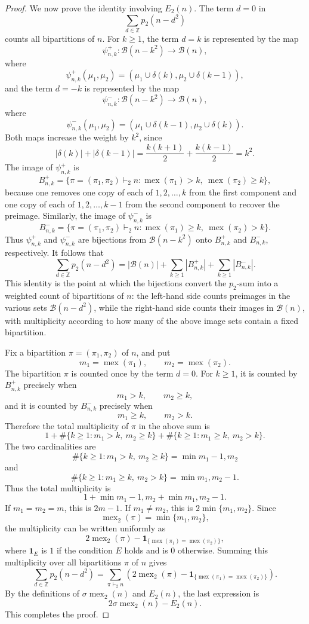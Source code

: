 \documentclass[10pt,a4paper]{amsart}
\newcommand{\mex}{\operatorname{mex}}
\begin{document}
\begin{proof}
We now prove the identity involving $E_2(n)$.  The term $d=0$ in
\[
\sum_{d\in\mathbb Z}p_2(n-d^2)
\]
counts all bipartitions of $n$.  For $k\geq 1$, the term $d=k$ is represented by the map
\[
\psi^+_{n,k}:\mathcal B(n-k^2)\longrightarrow \mathcal B(n),
\]
where
\[
\psi^+_{n,k}(\mu_1,\mu_2)
=
(\mu_1\cup\delta(k),\mu_2\cup\delta(k-1)),
\]
and the term $d=-k$ is represented by the map
\[
\psi^-_{n,k}:\mathcal B(n-k^2)\longrightarrow \mathcal B(n),
\]
where
\[
\psi^-_{n,k}(\mu_1,\mu_2)
=
(\mu_1\cup\delta(k-1),\mu_2\cup\delta(k)).
\]
Both maps increase the weight by $k^2$, since
\[
|\delta(k)|+|\delta(k-1)|
=
\frac{k(k+1)}2+\frac{k(k-1)}2
=k^2.
\]
The image of $\psi^+_{n,k}$ is
\[
B^+_{n,k}
=
\{\pi=(\pi_1,\pi_2)\vdash_2 n:
\mex(\pi_1)>k,\ \mex(\pi_2)\geq k\},
\]
because one removes one copy of each of $1,2,\ldots,k$ from the first component and one copy of each of $1,2,\ldots,k-1$ from the second component to recover the preimage.  Similarly, the image of $\psi^-_{n,k}$ is
\[
B^-_{n,k}
=
\{\pi=(\pi_1,\pi_2)\vdash_2 n:
\mex(\pi_1)\geq k,\ \mex(\pi_2)>k\}.
\]
Thus $\psi^+_{n,k}$ and $\psi^-_{n,k}$ are bijections from $\mathcal B(n-k^2)$ onto $B^+_{n,k}$ and $B^-_{n,k}$, respectively.  It follows that
\[
\sum_{d\in\mathbb Z}p_2(n-d^2)
=
|\mathcal B(n)|+
\sum_{k\geq 1}|B^+_{n,k}|+
\sum_{k\geq 1}|B^-_{n,k}|.
\]
This identity is the point at which the bijections convert the $p_2$-sum into a weighted count of bipartitions of $n$: the left-hand side counts preimages in the various sets $\mathcal B(n-d^2)$, while the right-hand side counts their images in $\mathcal B(n)$, with multiplicity according to how many of the above image sets contain a fixed bipartition.

Fix a bipartition $\pi=(\pi_1,\pi_2)$ of $n$, and put
\[
m_1=\mex(\pi_1),
\qquad
m_2=\mex(\pi_2).
\]
The bipartition $\pi$ is counted once by the term $d=0$.  For $k\geq 1$, it is counted by $B^+_{n,k}$ precisely when
\[
m_1>k,
\qquad
m_2\geq k,
\]
and it is counted by $B^-_{n,k}$ precisely when
\[
m_1\geq k,
\qquad
m_2>k.
\]
Therefore the total multiplicity of $\pi$ in the above sum is
\[
1+\#\{k\geq 1:m_1>k,\ m_2\geq k\}
 +\#\{k\geq 1:m_1\geq k,\ m_2>k\}.
\]
The two cardinalities are
\[
\#\{k\geq 1:m_1>k,\ m_2\geq k\}=\min{m_1-1,m_2}
\]
and
\[
\#\{k\geq 1:m_1\geq k,\ m_2>k\}=\min{m_1,m_2-1}.
\]
Thus the total multiplicity is
\[
1+\min{m_1-1,m_2}+\min{m_1,m_2-1}.
\]
If $m_1=m_2=m$, this is $2m-1$.  If $m_1\neq m_2$, this is $2\min\{m_1,m_2\}$.  Since
\[
\mex_2(\pi)=\min\{m_1,m_2\},
\]
the multiplicity can be written uniformly as
\[
2\mex_2(\pi)-\mathbf{1}_{\{\mex(\pi_1)=\mex(\pi_2)\}},
\]
where $\mathbf{1}_E$ is $1$ if the condition $E$ holds and is $0$ otherwise.  Summing this multiplicity over all bipartitions $\pi$ of $n$ gives
\[
\sum_{d\in\mathbb Z}p_2(n-d^2)
=
\sum_{\pi\vdash_2 n}
\left(2\mex_2(\pi)-\mathbf{1}_{\{\mex(\pi_1)=\mex(\pi_2)\}}\right).
\]
By the definitions of $\sigma\mex_2(n)$ and $E_2(n)$, the last expression is
\[
2\sigma\mex_2(n)-E_2(n).
\]
This completes the proof.
\end{proof}
\end{document}
